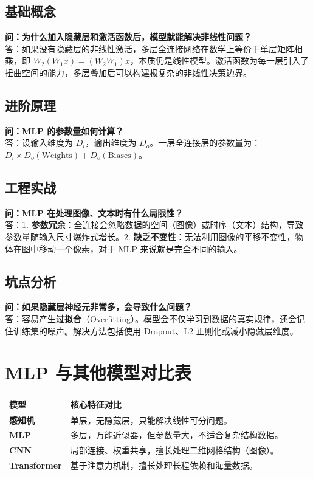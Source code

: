 \documentclass[12pt, a4paper]{book}
\begin{document}
\subsection{基础概念}
\textbf{问：为什么加入隐藏层和激活函数后，模型就能解决非线性问题？}\\
答：如果没有隐藏层的非线性激活，多层全连接网络在数学上等价于单层矩阵相乘，即 $W_2(W_1 x) = (W_2 W_1)x$，本质仍是线性模型。激活函数为每一层引入了扭曲空间的能力，多层叠加后可以构建极复杂的非线性决策边界。

\subsection{进阶原理}
\textbf{问：MLP 的参数量如何计算？}\\
答：设输入维度为 $D_i$，输出维度为 $D_o$。一层全连接层的参数量为：$D_i \times D_o (\text{Weights}) + D_o (\text{Biases})$。

\subsection{工程实战}
\textbf{问：MLP 在处理图像、文本时有什么局限性？}\\
答：1. \textbf{参数冗余}：全连接会忽略数据的空间（图像）或时序（文本）结构，导致参数量随输入尺寸爆炸式增长。2. \textbf{缺乏不变性}：无法利用图像的平移不变性，物体在图中移动一个像素，对于 MLP 来说就是完全不同的输入。

\subsection{坑点分析}
\textbf{问：如果隐藏层神经元非常多，会导致什么问题？}\\
答：容易产生\textbf{过拟合}（Overfitting）。模型会不仅学习到数据的真实规律，还会记住训练集的噪声。解决方法包括使用 Dropout、L2 正则化或减小隐藏层维度。

\section{MLP 与其他模型对比表}

\begin{table}[h]
\centering
\begin{tabularx}{\textwidth}{|l|X|}
\hline
\textbf{模型} & \textbf{核心特征对比} \\
\hline
\textbf{感知机} & 单层，无隐藏层，只能解决线性可分问题。 \\
\hline
\textbf{MLP} & 多层，万能近似器，但参数量大，不适合复杂结构数据。 \\
\hline
\textbf{CNN} & 局部连接、权重共享，擅长处理二维网格结构（图像）。 \\
\hline
\textbf{Transformer} & 基于注意力机制，擅长处理长程依赖和海量数据。 \\
\hline
\end{tabularx}
\end{table}
\end{document}
